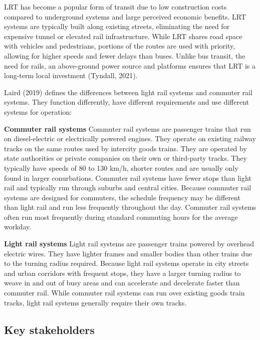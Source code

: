 \documentclass[
]{book}
\begin{document}
LRT has become a popular form of transit due to low construction costs compared to underground systems and large perceived economic benefits. LRT systems are typically built along existing streets, eliminating the need for expensive tunnel or elevated rail infrastructure. While LRT shares road space with vehicles and pedestrians, portions of the routes are used with priority, allowing for higher speeds and fewer delays than buses. Unlike bus transit, the need for rails, an above-ground power source and platforms ensures that LRT is a long-term local investment (Tyndall, 2021).

Laird (2019) defines the differences between light rail systems and commuter rail systems. They function differently, have different requirements and use different systems for operation:

\textbf{Commuter rail systems}
Commuter rail systems are passenger trains that run on diesel-electric or electrically powered engines. They operate on existing railway tracks on the same routes used by intercity goods trains. They are operated by state authorities or private companies on their own or third-party tracks. They typically have speeds of 80 to 130 km/h, shorter routes and are usually only found in larger conurbations. Commuter rail systems have fewer stops than light rail and typically run through suburbs and central cities. Because commuter rail systems are designed for commuters, the schedule frequency may be different than light rail and run less frequently throughout the day. Commuter rail systems often run most frequently during standard commuting hours for the average workday.

\textbf{Light rail systems}
Light rail systems are passenger trains powered by overhead electric wires. They have lighter frames and smaller bodies than other trains due to the turning radius required. Because light rail systems operate in city streets and urban corridors with frequent stops, they have a larger turning radius to weave in and out of busy areas and can accelerate and decelerate faster than commuter rail. While commuter rail systems can run over existing goods train tracks, light rail systems generally require their own tracks.

\hypertarget{key-stakeholders-38}{%
\subsection*{Key stakeholders}\label{key-stakeholders-38}}
\end{document}
